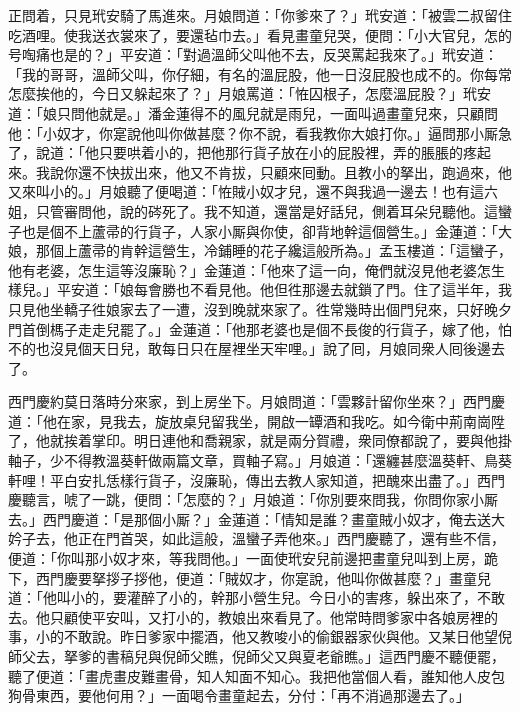 正問着，只見玳安騎了馬進來。月娘問道：「你爹來了？」玳安道：「被雲二叔留住吃酒哩。使我送衣裳來了，要還毡巾去。」看見畫童兒哭，便問：「小大官兒，怎的号啕痛也是的？」平安道：「對過溫師父叫他不去，反哭罵起我來了。」玳安道：「我的哥哥，溫師父叫，你仔細，有名的溫屁股，他一日沒屁股也成不的。你每常怎麼挨他的，今日又躲起來了？」{}月娘罵道：「恠囚根子，怎麼溫屁股？」玳安道：「娘只問他就是。」潘金蓮得不的風兒就是雨兒，{}一面叫過畫童兒來，只顧問他：「小奴才，你寔說他叫你做甚麼？你不說，看我教你大娘打你。」逼問那小厮急了，說道：「他只要哄着小的，把他那行貨子放在小的屁股裡，弄的脹脹的疼起來。我說你還不快拔出來，他又不肯拔，只顧來囘動。且教小的拏出，跑過來，他又來叫小的。」月娘聽了便喝道：「恠賊小奴才兒，還不與我過一邊去！也有這六姐，只管審問他，說的硶死了。我不知道，還當是好話兒，側着耳朵兒聽他。這蠻子也是個不上蘆帚的行貨子，人家小厮與你使，卻背地幹這個營生。」金蓮道：「大娘，那個上蘆帚的肯幹這營生，{}冷鋪睡的花子纔這般所為。」{}孟玉樓道：「這蠻子，他有老婆，怎生這等沒廉恥？」金蓮道：「他來了這一向，俺們就沒見他老婆怎生樣兒。」平安道：「娘每會勝也不看見他。他但徃那邊去就鎖了門。住了這半年，我只見他坐轎子徃娘家去了一遭，沒到晚就來家了。徃常幾時出個門兒來，只好晚夕門首倒榪子走走兒罷了。」金蓮道：「他那老婆也是個不長俊的行貨子，嫁了他，怕不的也沒見個天日兒，敢每日只在屋裡坐天牢哩。」說了囘，月娘同衆人囘後邊去了。

西門慶約莫日落時分來家，到上房坐下。月娘問道：「雲夥計留你坐來？」西門慶道：「他在家，見我去，旋放桌兒留我坐，開啟一罈酒和我吃。如今衛中荊南崗陞了，他就挨着掌印。明日連他和喬親家，就是兩分賀禮，衆同僚都說了，要與他掛軸子，少不得教溫葵軒做兩篇文章，買軸子寫。」月娘道：「還纏甚麼溫葵軒、鳥葵軒哩！平白安扎恁樣行貨子，沒廉恥，傳出去教人家知道，把醜來出盡了。」西門慶聽言，唬了一跳，{}便問：「怎麼的？」月娘道：「你別要來問我，你問你家小厮去。」西門慶道：「是那個小厮？」金蓮道：「情知是誰？畫童賊小奴才，俺去送大妗子去，他正在門首哭，如此這般，溫蠻子弄他來。」西門慶聽了，還有些不信，便道：「你叫那小奴才來，等我問他。」一面使玳安兒前邊把畫童兒叫到上房，跪下，西門慶要拏拶子拶他，{}便道：「賊奴才，你寔說，他叫你做甚麼？」畫童兒道：「他叫小的，要灌醉了小的，幹那小營生兒。{}今日小的害疼，躲出來了，不敢去。他只顧使平安叫，又打小的，教娘出來看見了。他常時問爹家中各娘房裡的事，小的不敢說。昨日爹家中擺酒，他又教唆小的偷銀器家伙與他。又某日他望倪師父去，拏爹的書稿兒與倪師父瞧，倪師父又與夏老爺瞧。」這西門慶不聽便罷，聽了便道：「畫虎畫皮難畫骨，知人知面不知心。我把他當個人看，誰知他人皮包狗骨東西，要他何用？」{}一面喝令畫童起去，分付：「再不消過那邊去了。」

